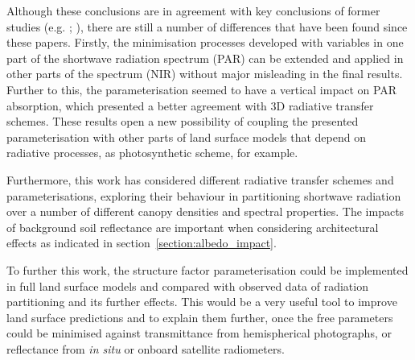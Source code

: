 \documentclass[a4paper,11pt]{report}
\begin{document}
Although these conclusions are in agreement with key conclusions of former studies (e.g. \citet{pinty2006}; \citet{Loew2014}), there are still a number of differences that have been found since these papers. Firstly, the minimisation processes developed with variables in one part of the shortwave radiation spectrum (PAR) can be extended and applied in other parts of the spectrum (NIR) without major misleading in the final results. Further to this, the parameterisation seemed to have a vertical impact on PAR absorption, which presented a better agreement with 3D radiative transfer schemes. These results open a new possibility of coupling the presented parameterisation with other parts of land surface models that depend on radiative processes, as photosynthetic scheme, for example.

Furthermore, this work has considered different radiative transfer schemes and parameterisations, exploring their behaviour in partitioning shortwave radiation over a number of different canopy densities and spectral properties. The impacts of background soil reflectance are important when considering architectural effects as indicated in section~\ref{section:albedo_impact}. 

To further this work, the structure factor parameterisation could be implemented in full land surface models and compared with observed data of radiation partitioning and its further effects. This would be a very useful tool to improve land surface predictions and to explain them further, once the free parameters could be minimised against transmittance from hemispherical photographs, or reflectance from \textit{in situ} or onboard satellite radiometers. 



%

%

\newpage
\pagestyle{plain}


%
%
\end{document}
